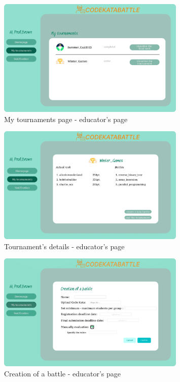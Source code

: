 \begin{figure}[H]
    \centering
    \includegraphics[width=0.8\textwidth]{images/user_interface/UI_sw2-12.png}
    \caption{My tournaments page - educator's page}
\end{figure}

\begin{figure}[H]
    \centering
    \includegraphics[width=0.8\textwidth]{images/user_interface/UI_sw2-13.png}
    \caption{Tournament's details - educator's page}
\end{figure}

\begin{figure}[H]
    \centering
    \includegraphics[width=0.8\textwidth]{images/user_interface/UI_sw2-14.png}
    \caption{Creation of a battle - educator's page}
\end{figure}

